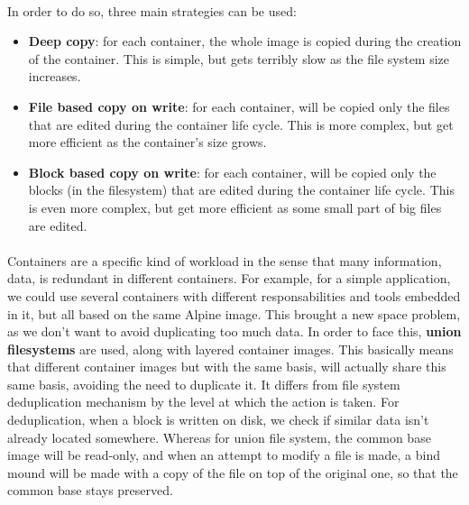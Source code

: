 \paragraph{}In order to do so, three main strategies can be used:
\begin{itemize}
\renewcommand\labelitemi{--}
  \item \textbf{Deep copy}: for each container, the whole image is copied during the creation of the container.  This is simple, but gets terribly slow as the file system size increases.
  \item \textbf{File based copy on write}: for each container, will be copied only the files that are edited during the container life cycle.  This is more complex, but get more efficient as the container's size grows.
  \item \textbf{Block based copy on write}: for each container, will be copied only the blocks (in the filesystem) that are edited during the container life cycle.  This is even more complex, but get more efficient as some small part of big files are edited.
\end{itemize}

\paragraph{}Containers are a specific kind of workload in the sense that many information, data, is redundant in different containers.  For example, for a simple application, we could use several containers with different responsabilities and tools embedded in it, but all based on the same Alpine image.  This brought a new space problem, as we don't want to avoid duplicating too much data.  In order to face this, \textbf{union filesystems} are used, along with layered container images.  This basically means that different container images but with the same basis, will actually share this same basis, avoiding the need to duplicate it.  It differs from file system deduplication mechanism by the level at which the action is taken.  For deduplication, when a block is written on disk, we check if similar data isn't already located somewhere.  Whereas for union file system, the common base image will be read-only, and when an attempt to modify a file is made, a bind mound will be made with a copy of the file on top of the original one, so that the common base stays preserved.

